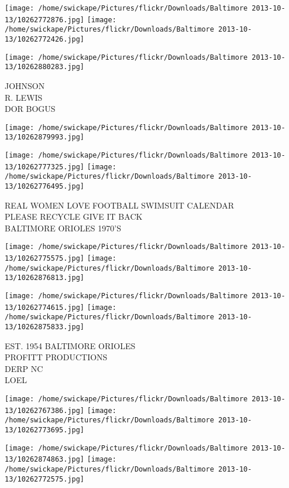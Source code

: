 \documentclass[10pt,letterpaper]{article}
\begin{document}
\texttt{[image: /home/swickape/Pictures/flickr/Downloads/Baltimore 2013-10-13/10262772876.jpg]}
\texttt{[image: /home/swickape/Pictures/flickr/Downloads/Baltimore 2013-10-13/10262772426.jpg]}

\vspace{0.25in}
\texttt{[image: /home/swickape/Pictures/flickr/Downloads/Baltimore 2013-10-13/10262880283.jpg]}

JOHNSON\\
R. LEWIS\\
DOR BOGUS\\
\pagebreak

\texttt{[image: /home/swickape/Pictures/flickr/Downloads/Baltimore 2013-10-13/10262879993.jpg]}

\vspace{0.25in}
\texttt{[image: /home/swickape/Pictures/flickr/Downloads/Baltimore 2013-10-13/10262777325.jpg]}
\texttt{[image: /home/swickape/Pictures/flickr/Downloads/Baltimore 2013-10-13/10262776495.jpg]}

REAL WOMEN LOVE FOOTBALL SWIMSUIT CALENDAR\\
PLEASE RECYCLE GIVE IT BACK\\
BALTIMORE ORIOLES 1970'S\\
\pagebreak

\texttt{[image: /home/swickape/Pictures/flickr/Downloads/Baltimore 2013-10-13/10262775575.jpg]}
\texttt{[image: /home/swickape/Pictures/flickr/Downloads/Baltimore 2013-10-13/10262876813.jpg]}

\texttt{[image: /home/swickape/Pictures/flickr/Downloads/Baltimore 2013-10-13/10262774615.jpg]}
\texttt{[image: /home/swickape/Pictures/flickr/Downloads/Baltimore 2013-10-13/10262875833.jpg]}

EST. 1954 BALTIMORE ORIOLES\\
PROFITT PRODUCTIONS\\
DERP NC\\
LOEL\\
\pagebreak

\texttt{[image: /home/swickape/Pictures/flickr/Downloads/Baltimore 2013-10-13/10262767386.jpg]}
\texttt{[image: /home/swickape/Pictures/flickr/Downloads/Baltimore 2013-10-13/10262773695.jpg]}

\texttt{[image: /home/swickape/Pictures/flickr/Downloads/Baltimore 2013-10-13/10262874863.jpg]}
\texttt{[image: /home/swickape/Pictures/flickr/Downloads/Baltimore 2013-10-13/10262772575.jpg]}
\end{document}
